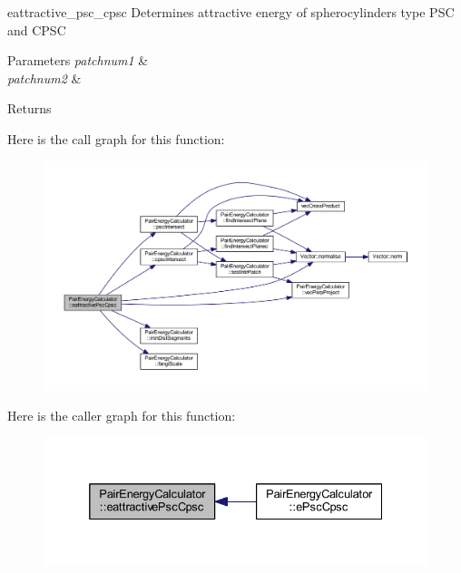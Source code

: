 eattractive\+\_\+psc\+\_\+cpsc Determines attractive energy of spherocylinders type P\+S\+C and C\+P\+S\+C 


\begin{DoxyParams}{Parameters}
{\em patchnum1} & \\
\hline
{\em patchnum2} & \\
\hline
\end{DoxyParams}
\begin{DoxyReturn}{Returns}

\end{DoxyReturn}


Here is the call graph for this function\+:\nopagebreak
\begin{figure}[H]
\begin{center}
\leavevmode
\includegraphics[width=350pt]{class_pair_energy_calculator_ab499a61da3b4d47baa95d1acbdde4d36_cgraph}
\end{center}
\end{figure}




Here is the caller graph for this function\+:\nopagebreak
\begin{figure}[H]
\begin{center}
\leavevmode
\includegraphics[width=332pt]{class_pair_energy_calculator_ab499a61da3b4d47baa95d1acbdde4d36_icgraph}
\end{center}
\end{figure}


